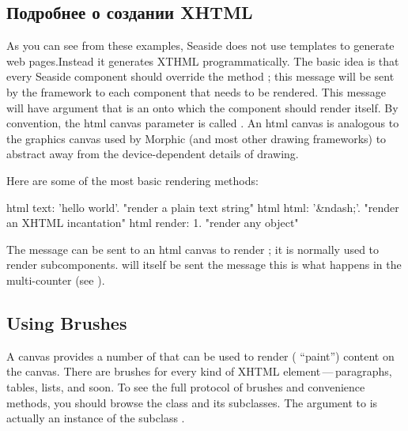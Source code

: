 \documentclass[a4paper,10pt,twoside]{book}
\begin{document}
\subsection{Подробнее о создании XHTML}

As you can see from these examples, Seaside does not use templates to generate web
pages.Instead it generates XTHML programmatically.
The basic idea is that every Seaside component should override the method
; this message will be sent by the framework to
each component that needs to be rendered.
This  message will have argument that is an   onto which the component should render itself. By
convention, the html canvas parameter is called .
An html canvas is analogous to the graphics canvas used by Morphic (and most other
drawing frameworks) to abstract away from the device-dependent details of drawing.
 

Here are some of the most basic rendering methods:
\begin{code}{}
html text: 'hello world'.  "render a plain text string"
html html: '&ndash;'.     "render an XHTML incantation"
html render: 1.              "render any object"
\end{code}

The message  can be sent to an html canvas to render
; it is normally used to render subcomponents.  will itself
be sent the message 
this is what happens in the multi-counter (see ).

\subsection{Using Brushes}

A canvas provides a number of  that can be used to render (\ie
``paint'') content on the canvas.
There are brushes for every kind of XHTML element\,---\,paragraphs, tables, lists, and soon.
To see the full protocol of brushes and convenience methods, you should browse the class
 and its subclasses.
The argument to  is actually an instance of the subclass
.
\end{document}
